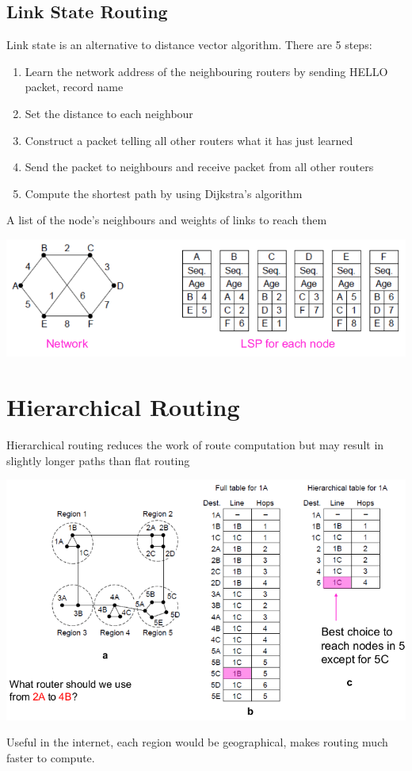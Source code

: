 \documentclass{article}[18pt]
\begin{document}
\subsection{Link State Routing}
Link state is an alternative to distance vector algorithm. There are 5 steps:
\begin{enumerate}
	\item Learn the network address of the neighbouring routers by sending HELLO packet, record name
	\item Set the distance to each neighbour
	\item Construct a packet telling all other routers what it has just learned
	\item Send the packet to neighbours and receive packet from all other routers
	\item Compute the shortest path by using Dijkstra's algorithm
\end{enumerate}
\begin{defin}
A list of the node's neighbours and weights of links to reach them
\end{defin}
\begin{center}
	\includegraphics[scale=0.7]{LSP}
\end{center}
\section{Hierarchical Routing}
Hierarchical routing reduces the work of route computation but may result in slightly longer paths than flat routing
\begin{center}
	\includegraphics[scale=0.7]{Hierarchical}
\end{center}
Useful in the internet, each region would be geographical, makes routing much faster to compute.
\end{document}
